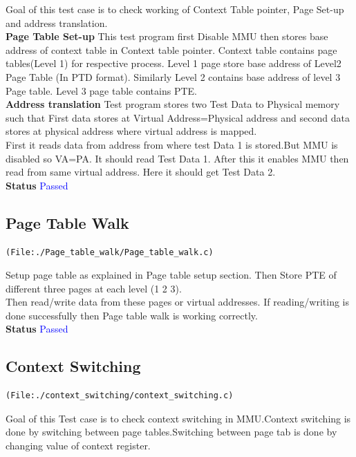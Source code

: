 \documentclass[12pt,a4paper]{article}
\begin{document}
Goal of this test case is to check working of Context Table pointer, Page Set-up and address translation.\\
\textbf{Page Table Set-up} This test program first Disable MMU then stores base address of context table in Context table pointer. Context table contains page tables(Level 1) for respective process. Level  1 page store base address of Level2 Page Table (In PTD format). Similarly Level 2 contains base address of level 3 Page table. Level 3 page table contains PTE.\\
\textbf{Address translation} Test program stores two Test Data to Physical memory such that First data stores at Virtual Address=Physical address and second data stores at physical address where virtual address is mapped.\\
 First it reads data from address from where test Data 1 is stored.But MMU is disabled so VA=PA. It should  read Test Data 1. After this it enables MMU then read from same virtual address. Here it should get Test Data 2.\\
\textbf{Status} \textcolor{blue}{Passed} 

\subsection{Page Table Walk} 
\begin{lstlisting}
(File:./Page_table_walk/Page_table_walk.c)
\end{lstlisting}

Setup page table as explained in Page table setup section.
Then Store PTE of different three pages at each level (1 2 3).\\
Then read/write data from these pages or virtual addresses. If reading/writing is done successfully then Page table walk is working correctly.\\
\textbf{Status} \textcolor{blue}{Passed} 

\subsection{Context Switching}
\begin{lstlisting}
(File:./context_switching/context_switching.c)
\end{lstlisting}

Goal of this Test case is to check context switching in MMU.Context switching is done by switching between page tables.Switching between page tab is done by changing value of context register. 
\end{document}

